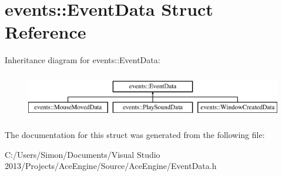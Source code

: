 \hypertarget{structevents_1_1_event_data}{}\section{events\+:\+:Event\+Data Struct Reference}
\label{structevents_1_1_event_data}
Inheritance diagram for events\+:\+:Event\+Data\+:\begin{figure}[H]
\begin{center}
\leavevmode
\includegraphics[height=2.000000cm]{structevents_1_1_event_data}
\end{center}
\end{figure}


The documentation for this struct was generated from the following file\+:\begin{DoxyCompactItemize}
\item 
C\+:/\+Users/\+Simon/\+Documents/\+Visual Studio 2013/\+Projects/\+Ace\+Engine/\+Source/\+Ace\+Engine/Event\+Data.\+h\end{DoxyCompactItemize}
